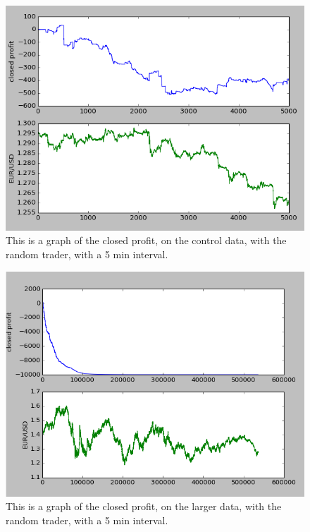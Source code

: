 \documentclass[10pt]{IEEEtran}
\begin{document}
\begin{figure}
    \includegraphics[scale = 0.5]{data-random-10000-20.png}
    \caption{This is a graph of the closed profit, on the control data, with the random trader, with a 5 min interval.}
\end{figure}

\begin{figure}
    \includegraphics[scale = 0.5]{fxdata-random-10000-20.png}
    \caption{This is a graph of the closed profit, on the larger data, with the random trader, with a 5 min interval.}
\end{figure}
\end{document}
